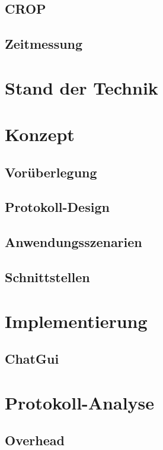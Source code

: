 \documentclass[
    11pt, %
    DIV=11,
    ngerman, %
    a4paper, %
    twoside, %
    titlepage, %
    parskip=half, %
    headings=normal, %
    listof=totoc, %
    bibliography=totoc, %
    index=totoc, %
    captions=tableheading, %
    final %
]{scrreprt}
\begin{document}
	\section{CROP}
		
	\section{Zeitmessung}
		

\chapter{Stand der Technik}
  

\chapter{Konzept}
	
	\section{Vorüberlegung}
		
	\newpage
	\section{Protokoll-Design}
		
	\section{Anwendungsszenarien}
		
	\section{Schnittstellen}
		

\chapter{Implementierung}
	
	\section{ChatGui}
	

\chapter{Protokoll-Analyse}
	
	\section{Overhead}
		
\end{document}
